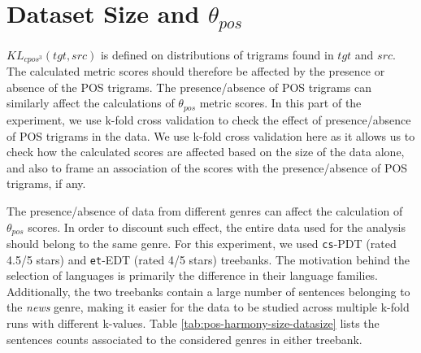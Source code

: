     \begin{table}[H]
    \end{table}

\section{Dataset Size and \texorpdfstring{$\theta_{pos}$}{theta\_pos}}
\label{sec:pos-harmony-size}

$KL_{cpos^{3}}(tgt, src)$ is defined on distributions of trigrams found in $tgt$ and $src$. The calculated metric scores should therefore be affected by the presence or absence of the POS trigrams. The presence/absence of POS trigrams can similarly affect the calculations of $\theta_{pos}$ metric scores. In this part of the experiment, we use k-fold cross validation to check the effect of presence/absence of POS trigrams in the data. We use k-fold cross validation here as it allows us to check how the calculated scores are affected based on the size of the data alone, and also to frame an association of the scores with the presence/absence of POS trigrams, if any. 

The presence/absence of data from different genres can affect the calculation of $\theta_{pos}$ scores. In order to discount such effect, the entire data used for the analysis should belong to the same genre. For this experiment, we used \verb|cs|-PDT (rated 4.5/5 stars) and \verb|et|-EDT (rated 4/5 stars) treebanks. The motivation behind the selection of languages is primarily the difference in their language families. Additionally, the two treebanks contain a large number of sentences belonging to the \textit{news} genre, making it easier for the data to be studied across multiple k-fold runs with different k-values. Table \ref{tab:pos-harmony-size-datasize} lists the sentences counts associated to the considered genres in either treebank.

